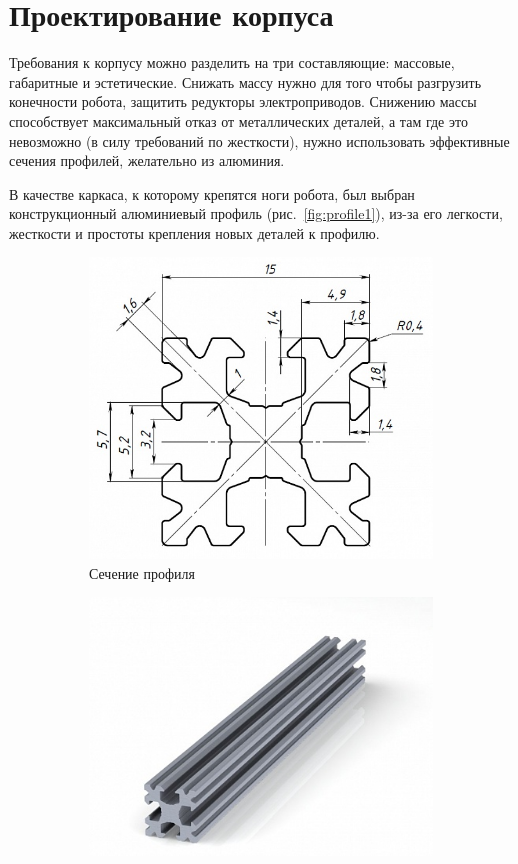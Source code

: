 \section{Проектирование корпуса}
Требования к корпусу можно разделить на три составляющие: массовые, габаритные и эстетические. Снижать массу нужно для того чтобы разгрузить конечности робота, защитить редукторы электроприводов. Снижению массы способствует максимальный отказ от металлических деталей, а там где это невозможно (в силу требований по жесткости), нужно использовать эффективные сечения профилей, желательно из алюминия.

В качестве каркаса, к которому крепятся ноги робота, был выбран конструкционный алюминиевый профиль (рис.~\ref{fig:profile1}), из-за его легкости, жесткости и простоты крепления новых деталей к профилю.
\begin{figure}[ht]
    \centering
    \begin{subfigure}[b]{0.45\textwidth}    
        \centering
        \includegraphics[scale=0.75]{chapter_mechanics_construction/figure8.png}
        \caption{Сечение профиля}
    \end{subfigure}
    \begin{subfigure}[b]{0.45\textwidth}
        \centering
        \includegraphics[scale=0.9]{chapter_mechanics_construction/figure9.png}

\end{subfigure}
\end{figure}
